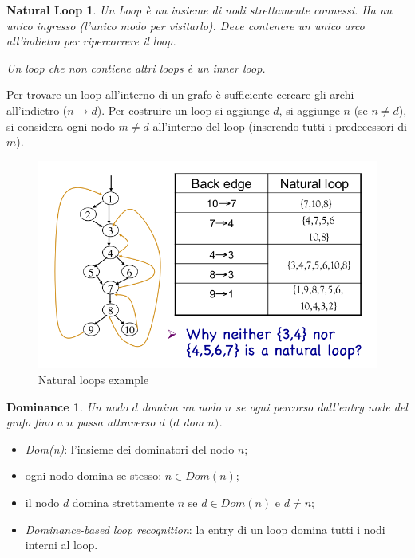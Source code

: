 \documentclass[a4paper, 10pt]{book}
\begin{document}
\newtheorem*{definit5}{Natural Loop}
\begin{definit5}
	Un Loop è un insieme di nodi strettamente connessi. Ha un unico ingresso (l'unico modo per visitarlo). Deve contenere un unico arco all'indietro per ripercorrere il loop.
	
	Un loop che non contiene altri loops è un \textit{inner loop}.
\end{definit5}
\noindent
Per trovare un loop all'interno di un grafo è sufficiente cercare gli archi all'indietro ($n\rightarrow d$).
\newline
Per costruire un loop si aggiunge $d$, si aggiunge $n$ (se $n\neq d$), si considera ogni nodo $m\neq d$ all'interno del loop (inserendo tutti i predecessori di $m$).
\newline

\begin{figure}[H]
	\centering
	\includegraphics[scale=0.27]{pngs/NaturalLoop}
	\caption{Natural loops example}
\end{figure}

\newtheorem*{definit6}{Dominance}
\begin{definit6}
	Un nodo $d$ domina un nodo $n$ se ogni percorso dall'entry node del grafo fino a $n$ passa attraverso $d$ $(d$ \textit{dom} $n)$.
\end{definit6}
\begin{itemize}
	\item \textit{Dom(n)}: l'insieme dei dominatori del nodo $n$;
	\item ogni nodo domina se stesso: $n\in Dom(n)$;
	\item il nodo $d$ domina strettamente $n$ se $d\in Dom(n)$ e $d\neq n$;
	\item \textit{Dominance-based loop recognition}: la entry di un loop domina tutti i nodi interni al loop.
\end{itemize}
\end{document}
